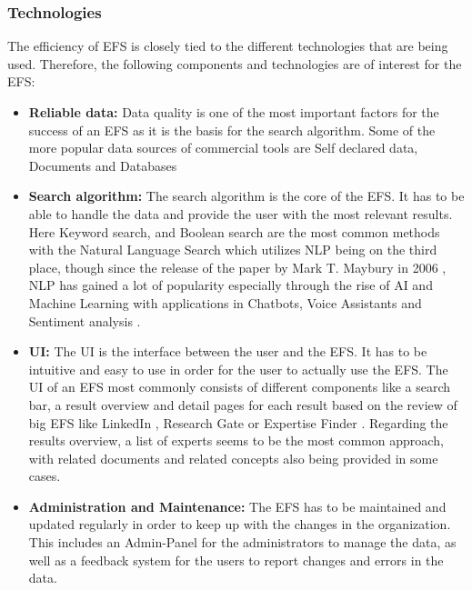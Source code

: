 \subsubsection{Technologies}
The efficiency of \ac{EFS} is closely tied to the different technologies that are being used. Therefore, the following components and technologies are of interest for the \ac{EFS}:
\begin{itemize}
    \item \textbf{Reliable data:} Data quality is one of the most important factors for the success of an \ac{EFS} as it is the basis for the search algorithm. Some of the more popular data sources of commercial tools are Self declared data, Documents and Databases \parencite[18]{maybury_expert_2006}
    \item \textbf{Search algorithm:} The search algorithm is the core of the \ac{EFS}. It has to be able to handle the data and provide the user with the most relevant results. Here Keyword search, and Boolean search are the most common methods with the Natural Language Search which utilizes \ac{NLP} being on the third place, though since the release of the paper by Mark T. Maybury in 2006 \parencite[18]{maybury_expert_2006}, \ac{NLP} has gained a lot of popularity especially through the rise of \ac{AI} and Machine Learning with applications in Chatbots, Voice Assistants and Sentiment analysis \parencite{administrator_role_2023}. 
    \item \textbf{\ac{UI}:} The \ac{UI} is the interface between the user and the \ac{EFS}. It has to be intuitive and easy to use in order for the user to actually use the \ac{EFS}. The \ac{UI} of an \ac{EFS} most commonly consists of different components like a search bar, a result overview and detail pages for each result based on the review of big \ac{EFS} like LinkedIn \parencite{noauthor_linkedin_nodate}, Research Gate \parencite{noauthor_researchgate_nodate} or Expertise Finder \parencite{noauthor_expertise_nodate-1}. Regarding the results overview, a list of experts seems to be the most common approach, with related documents and related concepts also being provided in some cases. \parencite[18]{maybury_expert_2006}
    \item \textbf{Administration and Maintenance:} The \ac{EFS} has to be maintained and updated regularly in order to keep up with the changes in the organization. This includes an Admin-Panel for the administrators to manage the data, as well as a feedback system for the users to report changes and errors in the data.
\end{itemize}
